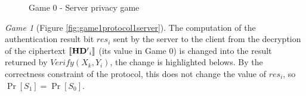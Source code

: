 \begin{figure}[htbp!] 
  \centering
  \caption{Game 0 - Server privacy game}
  \label{fig:game0protocol1server}
\end{figure}
\textit{Game 1} (Figure \ref{fig:game1protocol1server}). The computation of the
authentication result bit $res_{i}$ sent by the server to the client from the
decryption of the ciphertext \(\left\llbracket\mathbf{HD'}_{i}\right\rrbracket\) (its value in Game 0) is
changed into the result returned by $Verify(X_k, Y_{i})$, the change is
highlighted belows. By the correctness constraint of the protocol, this does not
change the value of $res_{i}$, so $\Pr[S_1] = \Pr[S_0]$.

